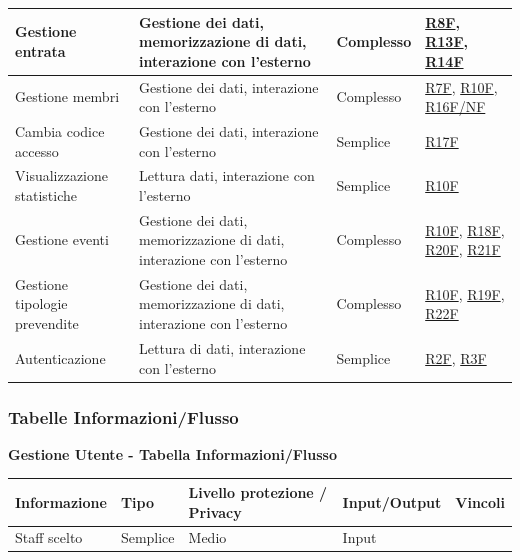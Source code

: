 \documentclass[a4paper]{article}
\begin{document}
\begin{center}
\begin{tabularx}{1\textwidth}{|X|X|X|X|}
        \hline
        Gestione entrata & Gestione dei dati, memorizzazione di dati, interazione con l'esterno & Complesso & \hyperlink{R8F}{R8F}, \hyperlink{R13F}{R13F}, \hyperlink{R14F}{R14F} \\
        \hline
        Gestione membri & Gestione dei dati, interazione con l'esterno & Complesso & \hyperlink{R7F}{R7F}, \hyperlink{R10F}{R10F}, \hyperlink{R16F/NF}{R16F/NF} \\
        \hline
        Cambia codice accesso & Gestione dei dati, interazione con l'esterno & Semplice & \hyperlink{R17F}{R17F}  \\
        \hline
        Visualizzazione statistiche & Lettura dati, interazione con l'esterno & Semplice & \hyperlink{R10F}{R10F}  \\
        \hline
        Gestione eventi & Gestione dei dati, memorizzazione di dati, interazione con l'esterno & Complesso & \hyperlink{R10F}{R10F}, \hyperlink{R18F}{R18F}, \hyperlink{R20F}{R20F}, \hyperlink{R21F}{R21F} \\
        \hline
        Gestione tipologie prevendite & Gestione dei dati, memorizzazione di dati, interazione con l'esterno & Complesso & \hyperlink{R10F}{R10F}, \hyperlink{R19F}{R19F}, \hyperlink{R22F}{R22F} \\
        \hline
        Autenticazione & Lettura di dati, interazione con l'esterno & Semplice & \hyperlink{R2F}{R2F}, \hyperlink{R3F}{R3F} \\
        \hline
    \end{tabularx}
\end{center}

\newpage

\subsubsection{Tabelle Informazioni/Flusso}


\textbf{Gestione Utente - Tabella Informazioni/Flusso}

\begin{center}
    \begin{tabularx}{1\textwidth}{|X|X|X|X|X|}
        \hline
        \textbf{Informazione} &\textbf{Tipo} & \textbf{Livello protezione / Privacy} & \textbf{Input/Output} & \textbf{Vincoli}\\
        \hline
        \hline
        \hline
        Staff scelto & Semplice & Medio & Input & \\
        \hline
    \end{tabularx}
\end{center}
\end{document}
